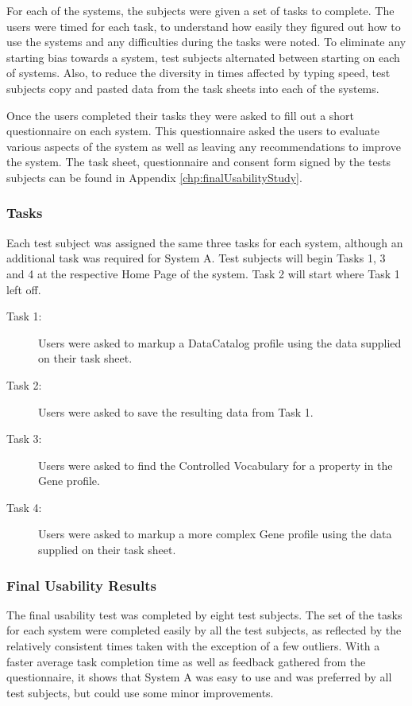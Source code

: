 For each of the systems, the subjects were given a set of tasks to complete. The users were timed for each task, to understand how easily they figured out how to use the systems and any difficulties during the tasks were noted. To eliminate any starting bias towards a system, test subjects alternated between starting on each of systems. Also, to reduce the diversity in times affected by typing speed, test subjects copy and pasted data from the task sheets into each of the systems.

Once the users completed their tasks they were asked to fill out a short questionnaire on each system. This questionnaire asked the users to evaluate various aspects of the system as well as leaving any recommendations to improve the system. The task sheet, questionnaire and consent form signed by the tests subjects can be found in Appendix \ref{chp:finalUsabilityStudy}. 

\subsubsection{Tasks}
Each test subject was assigned the same three tasks for each system, although an additional task was required for System A. Test subjects will begin Tasks 1, 3 and 4 at the respective Home Page of the system. Task 2 will start where Task 1 left off.

\begin{description}
  \item[Task 1:] Users were asked to markup a DataCatalog profile using the data supplied on their task sheet.
  \item[Task 2:] Users were asked to save the resulting data from Task 1.
  \item[Task 3:] Users were asked to find the Controlled Vocabulary for a property in the Gene profile.
  \item[Task 4:] Users were asked to markup a more complex Gene profile using the data supplied on their task sheet.
\end{description}

\subsubsection{Final Usability Results}\label{sec:finalUsabilityResults}
The final usability test was completed by eight test subjects. The set of the tasks for each system were completed easily by all the test subjects, as reflected by the relatively consistent times taken with the exception of a few outliers. With a faster average task completion time as well as feedback gathered from the questionnaire, it shows that System A was easy to use and was preferred by all test subjects, but could use some minor improvements.

